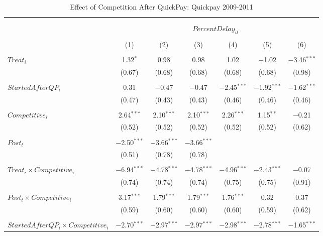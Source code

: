 \documentclass[
]{article}
\begin{document}
\begin{table}[H] \centering 
  \caption{Effect of Competition After QuickPay: Quickpay 2009-2011} 
  \label{} 
\small 
\begin{tabular}{@{\extracolsep{-3pt}}lcccccc} 
\\[-1.8ex]\hline 
\hline \\[-1.8ex] 
\\[-1.8ex] & \multicolumn{6}{c}{$PercentDelay_{it}$  } \\ 
\\[-1.8ex] & (1) & (2) & (3) & (4) & (5) & (6)\\ 
\hline \\[-1.8ex] 
 $Treat_i$ & 1.32$^{*}$ & 0.98 & 0.98 & 1.02 & $-$1.02 & $-$3.46$^{***}$ \\ 
  & (0.67) & (0.68) & (0.68) & (0.68) & (0.68) & (0.98) \\ 
  & & & & & & \\ 
 $StartedAfterQP_i$ & 0.31 & $-$0.47 & $-$0.47 & $-$2.45$^{***}$ & $-$1.92$^{***}$ & $-$1.62$^{***}$ \\ 
  & (0.47) & (0.43) & (0.43) & (0.46) & (0.46) & (0.46) \\ 
  & & & & & & \\ 
 $Competitive_i$ & 2.64$^{***}$ & 2.10$^{***}$ & 2.10$^{***}$ & 2.26$^{***}$ & 1.15$^{**}$ & $-$0.21 \\ 
  & (0.52) & (0.52) & (0.52) & (0.52) & (0.52) & (0.62) \\ 
  & & & & & & \\ 
 $Post_t$ & $-$2.50$^{***}$ & $-$3.66$^{***}$ & $-$3.66$^{***}$ &  &  &  \\ 
  & (0.51) & (0.78) & (0.78) &  &  &  \\ 
  & & & & & & \\ 
 $Treat_i \times Competitive_i$ & $-$6.94$^{***}$ & $-$4.78$^{***}$ & $-$4.78$^{***}$ & $-$4.96$^{***}$ & $-$2.43$^{***}$ & $-$0.07 \\ 
  & (0.74) & (0.74) & (0.74) & (0.75) & (0.75) & (0.91) \\ 
  & & & & & & \\ 
 $Post_t \times Competitive_i$ & 3.17$^{***}$ & 1.79$^{***}$ & 1.79$^{***}$ & 1.76$^{***}$ & 0.32 & 0.37 \\ 
  & (0.59) & (0.60) & (0.60) & (0.60) & (0.59) & (0.62) \\ 
  & & & & & & \\ 
 $StartedAfterQP_i \times Competitive_i$ & $-$2.70$^{***}$ & $-$2.97$^{***}$ & $-$2.97$^{***}$ & $-$2.98$^{***}$ & $-$2.78$^{***}$ & $-$1.65$^{***}$ \\ 

\end{tabular}
\end{table}
\end{document}
